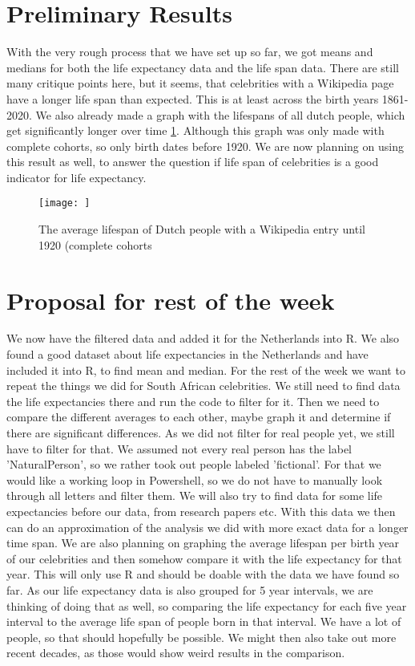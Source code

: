 \documentclass{article}
\begin{document}
\section{Preliminary Results}
With the very rough process that we have set up so far, we got means and medians for both the life expectancy data and the life span data. There are still many critique points here, but it seems, that celebrities with a Wikipedia page have a longer life span than expected. This is at least across the birth years 1861-2020. 
We also already made a graph with the lifespans of all dutch people, which get significantly longer over time \ref{fig:cohorts}. Although this graph was only made with complete cohorts, so only birth dates before 1920. We are now planning on using this result as well, to answer the question if life span of celebrities is a good indicator for life expectancy. 

\begin{figure}
	\centering
	\texttt{[image: ]}
	\caption{The average lifespan of Dutch people with a Wikipedia entry until 1920 (complete cohorts}
	\label{fig:cohorts}
\end{figure}

\section{Proposal for rest of the week}
We now have the filtered data and added it for the Netherlands into R. We also found a good dataset about life expectancies in the Netherlands and have included it into R, to find mean and median. For the rest of the week we want to repeat the things we did for South African celebrities. We still need to find data the life expectancies there and run the code to filter for it. Then we need to compare the different averages to each other, maybe graph it and determine if there are significant differences. 
As we did not filter for real people yet, we still have to filter for that. We assumed not every real person has the label 'NaturalPerson', so we rather took out people labeled 'fictional'. For that we would like a working loop in Powershell, so we do not have to manually look through all letters and filter them. 
We will also try to find data for some life expectancies before our data, from research papers etc. With this data we then can do an approximation of the analysis we did with more exact data for a longer time span.
We are also planning on graphing the average lifespan per birth year of our celebrities and then somehow compare it with the life expectancy for that year. This will only use R and should be doable with the data we have found so far. As our life expectancy data is also grouped for 5 year intervals, we are thinking of doing that as well, so comparing the life expectancy for each five year interval to the average life span of people born in that interval. We have a lot of people, so that should hopefully be possible. We might then also take out more recent decades, as those would show weird results in the comparison. 
\end{document}
